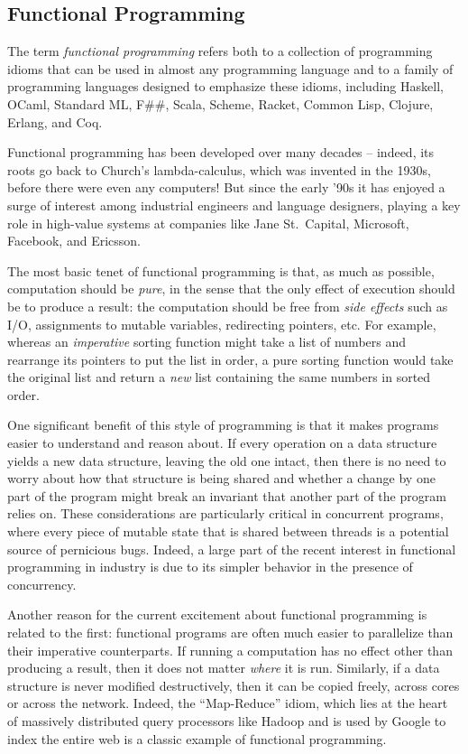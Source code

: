 \subsection{Functional Programming}\label{functional-programming}

The term \emph{functional programming} refers both to a collection of
programming idioms that can be used in almost any programming language
and to a family of programming languages designed to emphasize these
idioms, including Haskell, OCaml, Standard ML, F\#\#, Scala, Scheme,
Racket, Common Lisp, Clojure, Erlang, and Coq.

Functional programming has been developed over many decades -- indeed,
its roots go back to Church's lambda-calculus, which was invented in the
1930s, before there were even any computers! But since the early '90s it
has enjoyed a surge of interest among industrial engineers and language
designers, playing a key role in high-value systems at companies like
Jane St.~Capital, Microsoft, Facebook, and Ericsson.

The most basic tenet of functional programming is that, as much as
possible, computation should be \emph{pure}, in the sense that the only
effect of execution should be to produce a result: the computation
should be free from \emph{side effects} such as I/O, assignments to
mutable variables, redirecting pointers, etc. For example, whereas an
\emph{imperative} sorting function might take a list of numbers and
rearrange its pointers to put the list in order, a pure sorting function
would take the original list and return a \emph{new} list containing the
same numbers in sorted order.

One significant benefit of this style of programming is that it makes
programs easier to understand and reason about. If every operation on a
data structure yields a new data structure, leaving the old one intact,
then there is no need to worry about how that structure is being shared
and whether a change by one part of the program might break an invariant
that another part of the program relies on. These considerations are
particularly critical in concurrent programs, where every piece of
mutable state that is shared between threads is a potential source of
pernicious bugs. Indeed, a large part of the recent interest in
functional programming in industry is due to its simpler behavior in the
presence of concurrency.

Another reason for the current excitement about functional programming
is related to the first: functional programs are often much easier to
parallelize than their imperative counterparts. If running a computation
has no effect other than producing a result, then it does not matter
\emph{where} it is run. Similarly, if a data structure is never modified
destructively, then it can be copied freely, across cores or across the
network. Indeed, the ``Map-Reduce'' idiom, which lies at the heart of
massively distributed query processors like Hadoop and is used by Google
to index the entire web is a classic example of functional programming.

